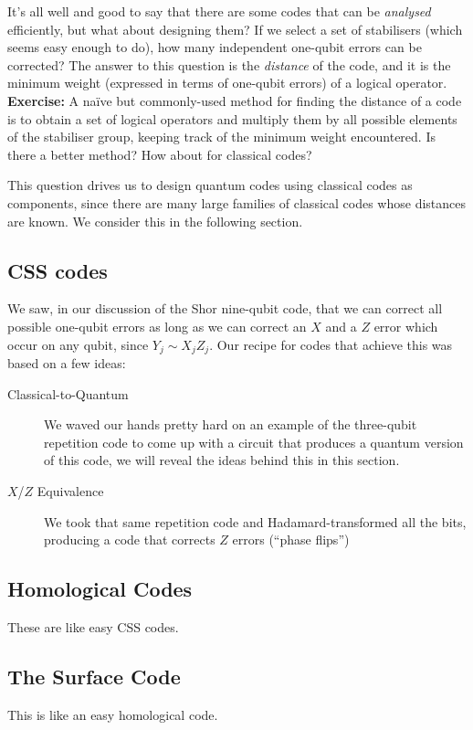 \documentclass[10pt,a4paper, english]{scrartcl}
\begin{document}
It's all well and good to say that there are some codes that can be \emph{analysed} efficiently, but what about designing them?
If we select a set of stabilisers (which seems easy enough to do), how many independent one-qubit errors can be corrected?
The answer to this question is the \emph{distance} of the code, and it is the minimum weight (expressed in terms of one-qubit errors) of a logical operator.\\ 
\textbf{Exercise: }A na\"ive but commonly-used method for finding the distance of a code is to obtain a set of logical operators and multiply them by all possible elements of the stabiliser group, keeping track of the minimum weight encountered. Is there a better method? How about for classical codes?

This question drives us to design quantum codes using classical codes as components, since there are many large families of classical codes whose distances are known. 
We consider this in the following section.
\subsection{CSS codes}
We saw, in our discussion of the Shor nine-qubit code, that we can correct all possible one-qubit errors as long as we can correct an $X$ and a $Z$ error which occur on any qubit, since $Y_j \sim X_j Z_j$. 
Our recipe for codes that achieve this was based on a few ideas:
\begin{description}
\item[Classical-to-Quantum] We waved our hands pretty hard on an example of the three-qubit repetition code to come up with a circuit that produces a quantum version of this code, we will reveal the ideas behind this in this section.
\item[$X$/$Z$ Equivalence] We took that same repetition code and Hadamard-transformed all the bits, producing a code that corrects $Z$ errors (``phase flips'')
\end{description}

\subsection{Homological Codes}
These are like easy CSS codes.
\subsection{The Surface Code}
This is like an easy homological code.
\end{document}
